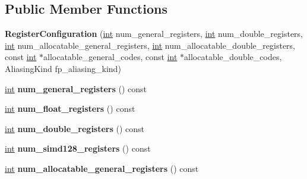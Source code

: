 \subsection*{Public Member Functions}
\begin{DoxyCompactItemize}
\item 
\mbox{\label{classv8_1_1internal_1_1RegisterConfiguration_a9506911d9df9eb40c47d9231b042ee80}} 
{\bfseries Register\+Configuration} (\mbox{\hyperlink{classint}{int}} num\+\_\+general\+\_\+registers, \mbox{\hyperlink{classint}{int}} num\+\_\+double\+\_\+registers, \mbox{\hyperlink{classint}{int}} num\+\_\+allocatable\+\_\+general\+\_\+registers, \mbox{\hyperlink{classint}{int}} num\+\_\+allocatable\+\_\+double\+\_\+registers, const \mbox{\hyperlink{classint}{int}} $\ast$allocatable\+\_\+general\+\_\+codes, const \mbox{\hyperlink{classint}{int}} $\ast$allocatable\+\_\+double\+\_\+codes, Aliasing\+Kind fp\+\_\+aliasing\+\_\+kind)
\item 
\mbox{\label{classv8_1_1internal_1_1RegisterConfiguration_a4303d47f990d565c58f2a03c6ff0c575}} 
\mbox{\hyperlink{classint}{int}} {\bfseries num\+\_\+general\+\_\+registers} () const
\item 
\mbox{\label{classv8_1_1internal_1_1RegisterConfiguration_a4535458db7f705f6cf101eb20f53ce24}} 
\mbox{\hyperlink{classint}{int}} {\bfseries num\+\_\+float\+\_\+registers} () const
\item 
\mbox{\label{classv8_1_1internal_1_1RegisterConfiguration_a72ee9a20955f55215914a2c5760e58ce}} 
\mbox{\hyperlink{classint}{int}} {\bfseries num\+\_\+double\+\_\+registers} () const
\item 
\mbox{\label{classv8_1_1internal_1_1RegisterConfiguration_af53e287d3f890c5dd038f19b56a36f1e}} 
\mbox{\hyperlink{classint}{int}} {\bfseries num\+\_\+simd128\+\_\+registers} () const
\item 
\mbox{\label{classv8_1_1internal_1_1RegisterConfiguration_a6e31fa3def971af63685de3a925bae53}} 
\mbox{\hyperlink{classint}{int}} {\bfseries num\+\_\+allocatable\+\_\+general\+\_\+registers} () const

\end{DoxyCompactItemize}
